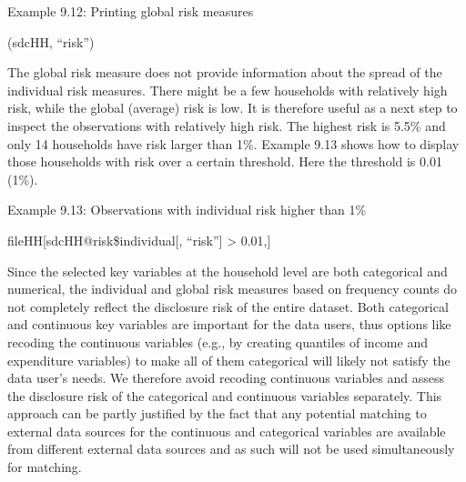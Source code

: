\documentclass[letterpaper,10pt,english]{sphinxmanual}
\begin{document}
Example 9.12: Printing global risk measures

(sdcHH, “risk”)

\begin{DUlineblock}{0em}
\item[] 
\item[] \sphinxcode{\sphinxupquote{\#\#}}
\item[] 
\item[] 
\end{DUlineblock}

The global risk measure does not provide information about the spread of
the individual risk measures. There might be a few households with
relatively high risk, while the global (average) risk is low. It is
therefore useful as a next step to inspect the observations with
relatively high risk. The highest risk is 5.5\% and only 14 households
have risk larger than 1\%. Example 9.13 shows how to display those
households with risk over a certain threshold. Here the threshold is
0.01 (1\%).

Example 9.13: Observations with individual risk higher than 1\%

\begin{DUlineblock}{0em}
\item[] 
\item[] fileHH{[}sdcHH@risk\$individual{[}, “risk”{]} \textgreater{} 0.01,{]}
\end{DUlineblock}

Since the selected key variables at the household level are both
categorical and numerical, the individual and global risk measures based
on frequency counts do not completely reflect the disclosure risk of the
entire dataset. Both categorical and continuous key variables are
important for the data users, thus options like recoding the continuous
variables (e.g., by creating quantiles of income and expenditure
variables) to make all of them categorical will likely not satisfy the
data user’s needs. We therefore avoid recoding continuous variables and
assess the disclosure risk of the categorical and continuous variables
separately. This approach can be partly justified by the fact that any
potential matching to external data sources for the continuous and
categorical variables are available from different external data sources
and as such will not be used simultaneously for matching.
\end{document}
